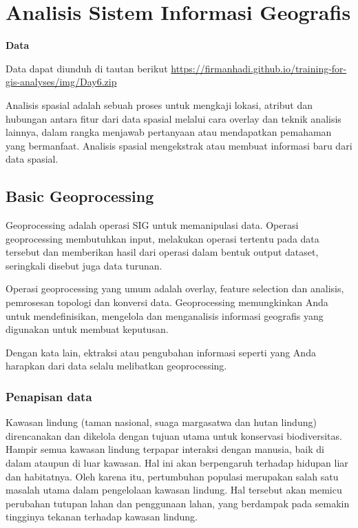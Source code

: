 \documentclass[]{book}
\begin{document}
\hypertarget{hari_keenam}{%
\chapter{Analisis Sistem Informasi Geografis}\label{hari_keenam}}

\textbf{Data}

Data dapat diunduh di tautan berikut \url{https://firmanhadi.github.io/training-for-gis-analyses/img/Day6.zip}

Analisis spasial adalah sebuah proses untuk mengkaji lokasi, atribut dan hubungan antara fitur dari data spasial melalui cara overlay dan teknik analisis lainnya, dalam rangka menjawab pertanyaan atau mendapatkan pemahaman yang bermanfaat. Analisis spasial mengekstrak atau membuat informasi baru dari data spasial.

\hypertarget{basic-geoprocessing}{%
\section{Basic Geoprocessing}\label{basic-geoprocessing}}

Geoprocessing adalah operasi SIG untuk memanipulasi data. Operasi geoprocessing membutuhkan input, melakukan operasi tertentu pada data tersebut dan memberikan hasil dari operasi dalam bentuk output dataset, seringkali disebut juga data turunan.

Operasi geoprocessing yang umum adalah overlay, feature selection dan analisis, pemrosesan topologi dan konversi data. Geoprocessing memungkinkan Anda untuk mendefinisikan, mengelola dan menganalisis informasi geografis yang digunakan untuk membuat keputusan.

Dengan kata lain, ektraksi atau pengubahan informasi seperti yang Anda harapkan dari data selalu melibatkan geoprocessing.

\hypertarget{penapisan-data}{%
\subsection{Penapisan data}\label{penapisan-data}}

Kawasan lindung (taman nasional, suaga margasatwa dan hutan lindung) direncanakan dan dikelola dengan tujuan utama untuk konservasi biodiversitas. Hampir semua kawasan lindung terpapar interaksi dengan manusia, baik di dalam ataupun di luar kawasan. Hal ini akan berpengaruh terhadap hidupan liar dan habitatnya. Oleh karena itu, pertumbuhan populasi merupakan salah satu masalah utama dalam pengelolaan kawasan lindung. Hal tersebut akan memicu perubahan tutupan lahan dan penggunaan lahan, yang berdampak pada semakin tingginya tekanan terhadap kawasan lindung.
\end{document}
